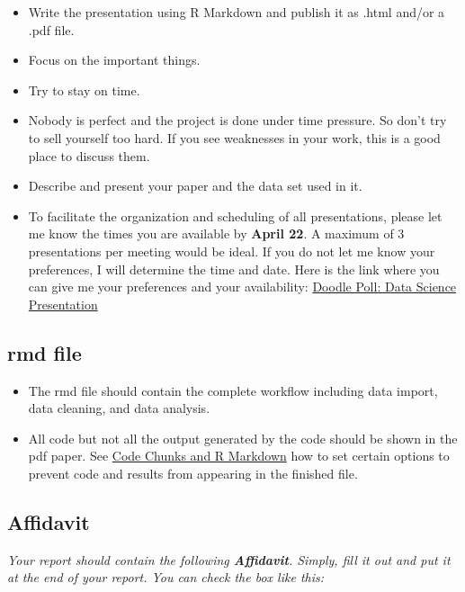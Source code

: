 \documentclass[
  12pt,
]{article}
\providecommand{\tightlist}{%
  \setlength{\itemsep}{0pt}\setlength{\parskip}{0pt}}
\begin{document}
\begin{itemize}
\tightlist
\item
  Write the presentation using R Markdown and publish it as .html and/or a .pdf file.
\item
  Focus on the important things.
\item
  Try to stay on time.
\item
  Nobody is perfect and the project is done under time pressure. So don't try to sell yourself too hard. If you see weaknesses in your work, this is a good place to discuss them.
\item
  Describe and present your paper and the data set used in it.
\item
  To facilitate the organization and scheduling of all presentations, please let me know the times you are available by \textbf{April 22}. A maximum of 3 presentations per meeting would be ideal. If you do not let me know your preferences, I will determine the time and date. Here is the link where you can give me your preferences and your availability:
  \href{https://doodle.com/meeting/participate/id/bojvq6Ya}{Doodle Poll: Data Science Presentation}
\end{itemize}

\hypertarget{rmd-file}{%
\subsection{rmd file}\label{rmd-file}}

\begin{itemize}
\tightlist
\item
  The rmd file should contain the complete workflow including data import, data cleaning, and data analysis.
\item
  All code but not all the output generated by the code should be shown in the pdf paper. See \href{https://rmarkdown.rstudio.com/lesson-3.html}{Code Chunks and R Markdown} how to set certain options to prevent code and results from appearing in the finished file.
\end{itemize}

\hypertarget{affidavit}{%
\subsection{Affidavit}\label{affidavit}}

\emph{Your report should contain the following \textbf{Affidavit}. Simply, fill it out and put it at the end of your report. You can check the box like this:}
\end{document}
